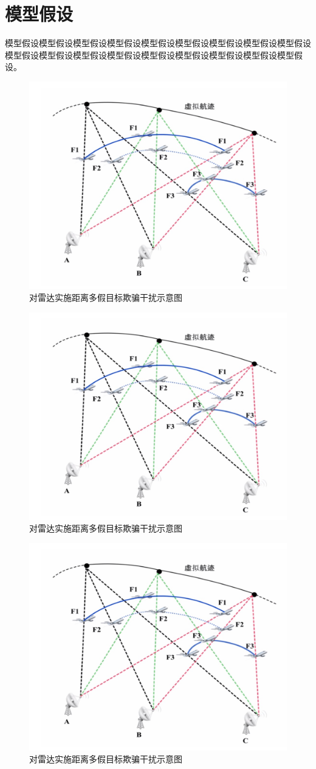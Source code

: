 \documentclass[bwprint]{gmcmthesis}
\numberwithin{figure}{section}
\begin{document}
\section{模型假设}
模型假设模型假设模型假设模型假设模型假设模型假设模型假设模型假设模型假设模型假设模型假设模型假设模型假设模型假设模型假设模型假设模型假设模型假设。
\begin{figure}[!h]
\centering
\includegraphics[width=.7\textwidth]{test.jpg}
\caption{对雷达实施距离多假目标欺骗干扰示意图}
\label{fig1}
\end{figure}

\begin{figure}[!h]
\centering
\includegraphics[width=.7\textwidth]{test.jpg}
\caption{对雷达实施距离多假目标欺骗干扰示意图}
\label{fig1}
\end{figure}

\begin{figure}[!h]
\centering
\includegraphics[width=.7\textwidth]{test.jpg}
\caption{对雷达实施距离多假目标欺骗干扰示意图}
\label{fig1}
\end{figure}
\end{document}
